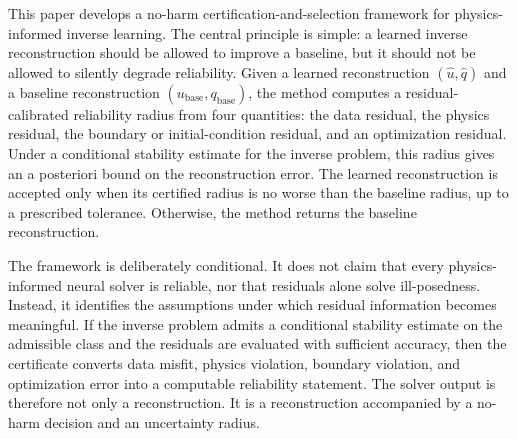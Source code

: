 \documentclass{article}
\numberwithin{equation}{section}
\theoremstyle{definition}
\begin{document}
This paper develops a no-harm certification-and-selection framework for physics-informed inverse learning. The central principle is simple: a learned inverse reconstruction should be allowed to improve a baseline, but it should not be allowed to silently degrade reliability. Given a learned reconstruction \((\widehat u,\widehat q)\) and a baseline reconstruction \((u_{\mathrm{base}},q_{\mathrm{base}})\), the method computes a residual-calibrated reliability radius from four quantities: the data residual, the physics residual, the boundary or initial-condition residual, and an optimization residual. Under a conditional stability estimate for the inverse problem, this radius gives an a posteriori bound on the reconstruction error. The learned reconstruction is accepted only when its certified radius is no worse than the baseline radius, up to a prescribed tolerance. Otherwise, the method returns the baseline reconstruction.

The framework is deliberately conditional. It does not claim that every physics-informed neural solver is reliable, nor that residuals alone solve ill-posedness. Instead, it identifies the assumptions under which residual information becomes meaningful. If the inverse problem admits a conditional stability estimate on the admissible class and the residuals are evaluated with sufficient accuracy, then the certificate converts data misfit, physics violation, boundary violation, and optimization error into a computable reliability statement. The solver output is therefore not only a reconstruction. It is a reconstruction accompanied by a no-harm decision and an uncertainty radius.
\end{document}
